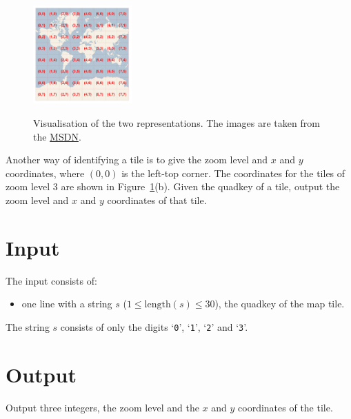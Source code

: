 \begin{figure}[h]
{\else
		\includegraphics[width=0.338\textwidth]{maptiles2.jpg}
\fi
	}
	\caption{Visualisation of the two representations. The images are taken from the \href{https://msdn.microsoft.com/en-us/library/bb259689.aspx}{MSDN}.}
    \label{fig:maps}
\end{figure}

Another way of identifying a tile is to give the zoom level and $x$ and $y$ coordinates, where $(0,0)$ is the left-top corner. The coordinates for the tiles of zoom level 3 are shown in Figure~\ref{fig:maps}(b). Given the quadkey of a tile, output the zoom level and $x$ and $y$ coordinates of that tile.

\section*{Input}

The input consists of:
\begin{itemize}
   \item one line with a string $s$ ($1\leq \text{length}(s) \leq 30$), the quadkey of the map tile.
\end{itemize}
The string $s$ consists of only the digits `\texttt{0}', `\texttt{1}', `\texttt{2}' and `\texttt{3}'.

\section*{Output}

Output three integers, the zoom level and the $x$ and $y$ coordinates of the tile.
